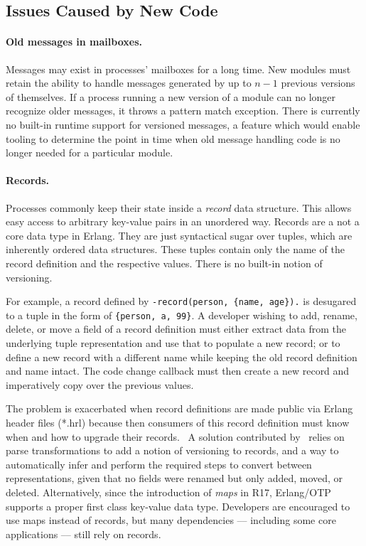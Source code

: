 \subsection{Issues Caused by New Code}

\paragraph{Old messages in mailboxes.}
Messages may exist in processes' mailboxes for a long time. New modules must retain the ability to handle messages generated by up to $n-1$ previous versions of themselves. If a process running a new version of a module can no longer recognize older messages, it throws a pattern match exception. There is currently no built-in runtime support for versioned messages, a feature which would enable tooling to determine the point in time when old message handling code is no longer needed for a particular module.

\paragraph{Records.}
Processes commonly keep their state inside a \emph{record} data structure. This allows easy access to arbitrary key-value pairs in an unordered way. Records are a not a core data type in Erlang. They are just syntactical sugar over tuples, which are inherently ordered data structures. These tuples contain only the name of the record definition and the respective values. There is no built-in notion of versioning.

For example, a record defined by \lstinline|-record(person, {name, age}).| is desugared to a tuple in the form of \lstinline|{person, a, 99}|. A developer wishing to add, rename, delete, or move a field of a record definition must either extract data from the underlying tuple representation and use that to populate a new record; or to define a new record with a different name while keeping the old record definition and name intact. The code change callback must then create a new record and imperatively copy over the previous values.

The problem is exacerbated when record definitions are made public via Erlang header files (*.hrl) because then consumers of this record definition must know when and how to upgrade their records.~\cite{davis:talk} A solution contributed by~\cite{wiger:parsetrans} relies on parse transformations to add a notion of versioning to records, and a way to automatically infer and perform the required steps to convert between representations, given that no fields were renamed but only added, moved, or deleted. Alternatively, since the introduction of \emph{maps} in R17, Erlang/OTP supports a proper first class key-value data type. Developers are encouraged to use maps instead of records, but many dependencies –– including some core applications –– still rely on records.

